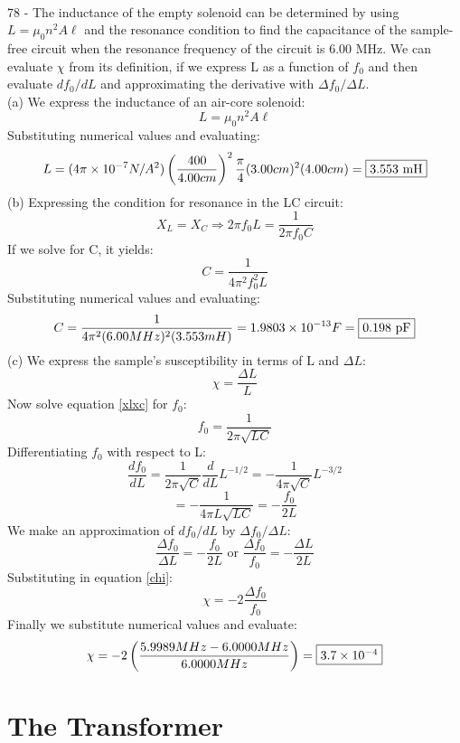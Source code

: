 \documentclass{report}
\begin{document}
\paragraph{}
78 - The inductance of the empty solenoid can be determined by using $L = \mu_0 n^2 A\ell$ and the resonance condition to find the capacitance of the sample-free circuit when the resonance frequency of the circuit is 6.00 MHz. We can evaluate $\chi$ from its definition, if we express L as a function of $f_0$ and then evaluate $df_0 / dL$ and approximating the derivative with $\Delta f_0 / \Delta L$.\\
(a) We express the inductance of an air-core solenoid:
$$L = \mu_0 n^2 A\ell$$
Substituting numerical values and evaluating:
$$L = (4 \pi \times 10^{-7}N / A^2)\left( \frac{400}{4.00 cm} \right)^2 \frac{\pi}{4} (3.00 cm)^2(4.00 cm) = \fbox{3.553 mH}$$
(b) Expressing the condition for resonance in the LC circuit:
\begin{equation}\label{xlxc}
  X_L = X_C \Rightarrow 2 \pi f_0 L = \frac{1}{2 \pi f_0 C}
\end{equation}
If we solve for C, it yields:
$$C = \frac{1}{4 \pi^2 f_0^2 L}$$
Substituting numerical values and evaluating:
$$C = \frac{1}{4 \pi^2 (6.00 MHz)^2(3.553 mH)} = 1.9803 \times 10^{-13}F = \fbox{0.198 pF}$$
(c) We express the sample's susceptibility in terms of L and $\Delta L$:
\begin{equation}\label{chi}
  \chi = \frac{\Delta L}{L}
\end{equation}
Now solve equation \ref{xlxc} for $f_0$:
$$f_0 = \frac{1}{2 \pi \sqrt{LC}}$$
Differentiating $f_0$ with respect to L:
$$\frac{df_0}{dL} = \frac{1}{2 \pi \sqrt{C}} \frac{d}{dL}L^{-1/2} = -\frac{1}{4 \pi \sqrt{C}}L^{-3/2}$$
$$= -\frac{1}{4 \pi L \sqrt{LC}} = -\frac{f_0}{2L}$$
We make an approximation of $df_0 / dL$ by $\Delta f_0 / \Delta L$:
$$\frac{\Delta f_0}{\Delta L} = -\frac{f_0}{2L} \text{ or } \frac{\Delta f_0}{f_0} = -\frac{\Delta L}{2L}$$
Substituting in equation \ref{chi}:
$$\chi = -2\frac{\Delta f_0}{f_0}$$
Finally we substitute numerical values and evaluate:
$$\chi = -2 \left( \frac{5.9989 MHz - 6.0000 MHz}{6.0000 MHz} \right) = \fbox{$3.7 \times 10^{-4}$}$$

\section{The Transformer}
\end{document}

